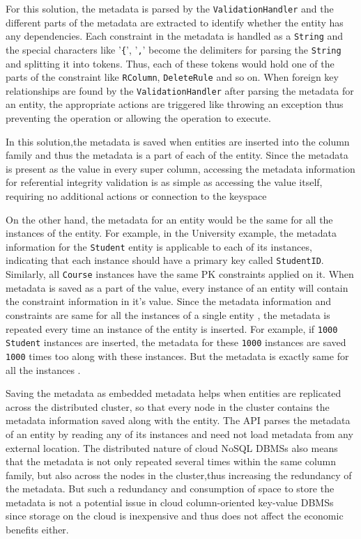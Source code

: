 	For this solution, the metadata is
	parsed by the \texttt{ValidationHandler} and  the different parts of the
	metadata are extracted to identify whether the entity has any dependencies.   
	Each constraint in the metadata is handled as a
	\texttt{String} and the special characters like '\texttt{\{}', '\texttt{,}'
	become the delimiters for parsing the \texttt{String} and splitting it into tokens.  
	Thus, each of these tokens
	would hold one of the parts of the constraint like \texttt{RColumn},
	\texttt{DeleteRule} and so on. 
	When foreign key relationships are found by the
	\texttt{ValidationHandler} after parsing the metadata for an entity, the
	appropriate actions are triggered like throwing an exception thus preventing the operation 
	or allowing the operation to execute. 
	
	In this solution,the metadata is saved  when entities are inserted into the
	column family and thus the metadata is a part of each of the entity.  Since the
	metadata is present as the value in every super column, accessing the metadata
	information for referential integrity validation is as simple as accessing the
	value itself, requiring no additional actions or connection to the keyspace
	
	On the other hand, the metadata for an entity would be the same for all the
	instances of the entity.  For example, in the University example, the metadata
	information for the \texttt{Student} entity is applicable to each of its
	instances, indicating that each instance  should have a primary key called
	\texttt{StudentID}. 
	Similarly, all \texttt{Course} instances have the same \ac{PK} constraints
	applied on it.  When metadata is saved as a part of the  value,
	every instance of an entity will contain the constraint information
	in it's value.  Since the metadata information and constraints are same for all
	the instances of a single entity , the metadata is repeated every time an
	instance of the entity is inserted.  For example, if 
	\texttt{1000} \texttt{Student} instances are inserted, the metadata for these
	\texttt{1000} instances are saved \texttt{1000} times too along with these
	instances.  But the metadata is exactly same for all the
	instances . 
	
	Saving the metadata as embedded metadata helps when 
	entities are replicated across the distributed cluster, so that every node in
	the cluster contains the metadata information saved along with the entity.  The
	\ac{API} parses the metadata of an entity by reading any of its instances and
	need not load metadata from any external location. 
	The distributed nature of cloud \ac{NoSQL} \acp{DBMS} also means that the
	metadata is not only repeated several times within the same column family, but
	also across the nodes in the cluster,thus increasing the redundancy of
	the metadata.  But such a redundancy and consumption
	of space to store the metadata is not a potential issue in cloud column-oriented key-value \acp{DBMS} since storage on the cloud is inexpensive and thus does not affect the economic benefits either. 
	
